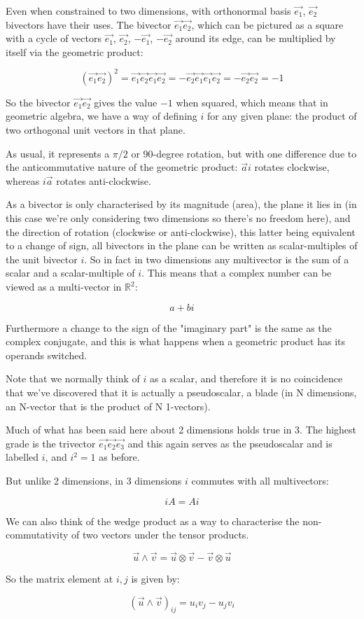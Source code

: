 Even when constrained to two dimensions, with orthonormal basis $\vec{e_1}$, $\vec{e_2}$ bivectors have their uses. The bivector $\vec{e_1}\vec{e_2}$, which can be pictured as a square with a cycle of vectors $\vec{e_1}$, $\vec{e_2}$, $-\vec{e_1}$, $-\vec{e_2}$ around its edge, can be multiplied by itself via the geometric product:

$$
(\vec{e_1}\vec{e_2})^2
= \vec{e_1}\vec{e_2}\vec{e_1}\vec{e_2}
= -\vec{e_2}\vec{e_1}\vec{e_1}\vec{e_2}
= -\vec{e_2}\vec{e_2}
= -1
$$

So the bivector $\vec{e_1}\vec{e_2}$ gives the value $-1$ when squared, which means that in geometric algebra, we have a way of defining $i$ for any given plane: the product of two orthogonal unit vectors in that plane.

As usual, it represents a $\pi/2$ or $90$-degree rotation, but with one difference due to the anticommutative nature of the geometric product: $\vec{a}i$ rotates clockwise, whereas $i\vec{a}$ rotates anti-clockwise.

As a bivector is only characterised by its magnitude (area), the plane it lies in (in this case we're only considering two dimensions so there's no freedom here), and the direction of rotation (clockwise or anti-clockwise), this latter being equivalent to a change of sign, all bivectors in the plane can be written as scalar-multiples of the unit bivector $i$. So in fact in two dimensions any multivector is the sum of a scalar and a scalar-multiple of $i$. This means that a complex number can be viewed as a multi-vector in $\mathbb{R}^2$:

$$a+bi$$

Furthermore a change to the sign of the "imaginary part" is the same as the complex conjugate, and this is what happens when a geometric product has its operands switched.

Note that we normally think of $i$ as a scalar, and therefore it is no coincidence that we've discovered that it is actually a pseudoscalar, a blade (in N dimensions, an N-vector that is the product of N 1-vectors).

Much of what has been said here about 2 dimensions holds true in 3. The highest grade is the trivector $\vec{e_1}\vec{e_2}\vec{e_3}$ and this again serves as the pseudoscalar and is labelled $i$, and $i^2=1$ as before.

But unlike 2 dimensions, in 3 dimensions $i$ commutes with all multivectors:

$$iA = Ai$$

We can also think of the wedge product as a way to characterise the non-commutativity of two vectors under the tensor products.

$$\vec{u} \wedge \vec{v} = \vec{u} \otimes \vec{v} - \vec{v} \otimes \vec{u}$$

So the matrix element at $i, j$ is given by:

$$(\vec{u} \wedge \vec{v})_{ij} = u_i v_j - u_j v_i$$

